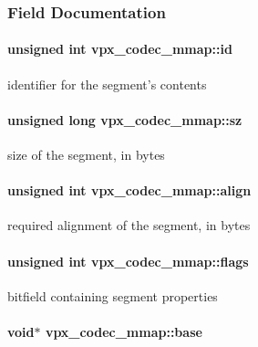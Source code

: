 \subsubsection{Field Documentation}
\hypertarget{structvpx__codec__mmap_a83f482a223678a60c22362f44e36e8c8}{
\paragraph[{id}]{\setlength{\rightskip}{0pt plus 5cm}unsigned int vpx\+\_\+codec\+\_\+mmap\+::id}}\label{structvpx__codec__mmap_a83f482a223678a60c22362f44e36e8c8}
identifier for the segment's contents \hypertarget{structvpx__codec__mmap_ae6822e6985cef61d2341a8d429bea079}{
\paragraph[{sz}]{\setlength{\rightskip}{0pt plus 5cm}unsigned long vpx\+\_\+codec\+\_\+mmap\+::sz}}\label{structvpx__codec__mmap_ae6822e6985cef61d2341a8d429bea079}
size of the segment, in bytes \hypertarget{structvpx__codec__mmap_a7875d3878f1d58c205f396c1f696987b}{
\paragraph[{align}]{\setlength{\rightskip}{0pt plus 5cm}unsigned int vpx\+\_\+codec\+\_\+mmap\+::align}}\label{structvpx__codec__mmap_a7875d3878f1d58c205f396c1f696987b}
required alignment of the segment, in bytes \hypertarget{structvpx__codec__mmap_afd7f8fed412b7bb524bed8e6ed14400d}{
\paragraph[{flags}]{\setlength{\rightskip}{0pt plus 5cm}unsigned int vpx\+\_\+codec\+\_\+mmap\+::flags}}\label{structvpx__codec__mmap_afd7f8fed412b7bb524bed8e6ed14400d}
bitfield containing segment properties \hypertarget{structvpx__codec__mmap_a0f7580ef4f5680df53c1ef3bd5f66d01}{
\paragraph[{base}]{\setlength{\rightskip}{0pt plus 5cm}void$\ast$ vpx\+\_\+codec\+\_\+mmap\+::base}}\label{structvpx__codec__mmap_a0f7580ef4f5680df53c1ef3bd5f66d01}
